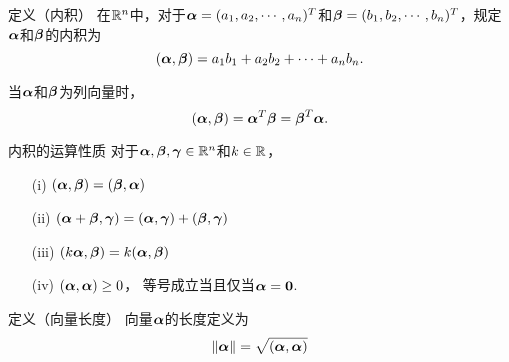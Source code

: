 \begin{frame}
  \begin{footnotesize}
    \begin{block}{定义（内积）}
      在$\mathbb{R}^n$中，对于$\boldsymbol{\alpha}=(a_1,a_2,\cdots,a_n)^T$和$\boldsymbol{\beta}=(b_1,b_2,\cdots,b_n)^T$，规定$\boldsymbol{\alpha}$和$\boldsymbol{\beta}$的内积为 
      $$
      (\boldsymbol{\alpha},\boldsymbol{\beta})=a_1b_1+a_2b_2+\cdots+a_nb_n.
      $$
    \end{block}
    当$\boldsymbol{\alpha}$和$\boldsymbol{\beta}$为列向量时，
    $$
    (\boldsymbol{\alpha},\boldsymbol{\beta})=\boldsymbol{\alpha}^T\boldsymbol{\beta}=\boldsymbol{\beta}^T\boldsymbol{\alpha}.
    $$
  \end{footnotesize}
\end{frame}

\begin{frame}
  \begin{footnotesize}
    \begin{block}{内积的运算性质}
      对于$\boldsymbol{\alpha},\boldsymbol{\beta},\boldsymbol{\gamma}\in\mathbb{R}^n$和$k\in\mathbb{R}$，
      \begin{itemize}
      \item[(i)]   $(\boldsymbol{\alpha},\boldsymbol{\beta})=(\boldsymbol{\beta},\boldsymbol{\alpha})$
      \item[(ii)]  $(\boldsymbol{\alpha}+\boldsymbol{\beta},\boldsymbol{\gamma})=(\boldsymbol{\alpha},\boldsymbol{\gamma})+(\boldsymbol{\beta},\boldsymbol{\gamma})$
      \item[(iii)] $(k\boldsymbol{\alpha},\boldsymbol{\beta})=k(\boldsymbol{\alpha},\boldsymbol{\beta})$
      \item[(iv)]  $(\boldsymbol{\alpha},\boldsymbol{\alpha})\ge0$， 等号成立当且仅当$\boldsymbol{\alpha}=\mathbf{0}$.
      \end{itemize}
    \end{block}
    \pause
    \begin{block}{定义（向量长度）}
      向量$\boldsymbol{\alpha}$的长度定义为
      $$
      \|\boldsymbol{\alpha}\|=\sqrt{(\boldsymbol{\alpha},\boldsymbol{\alpha})}
      $$
    \end{block}
  \end{footnotesize}
\end{frame}


